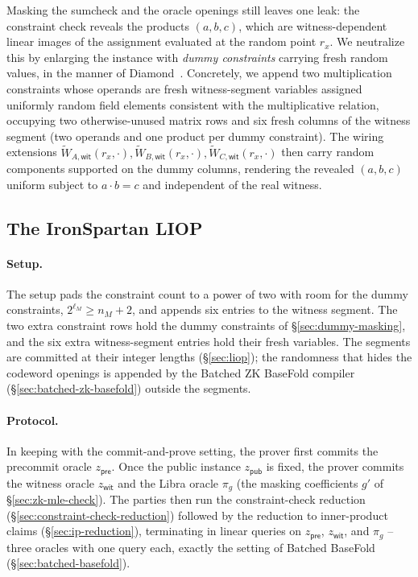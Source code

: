 \documentclass{article}
\theoremstyle{definition}
\newcommand*{\mle}{\widetilde}
\begin{document}
Masking the sumcheck and the oracle openings still leaves one leak: the constraint check reveals the products $(a, b, c)$, which are witness-dependent linear images of the assignment evaluated at the random point $r_x$. We neutralize this by enlarging the instance with \emph{dummy constraints} carrying fresh random values, in the manner of Diamond~\cite{Diamond:2025ac}. Concretely, we append two multiplication constraints whose operands are fresh witness-segment variables assigned uniformly random field elements consistent with the multiplicative relation, occupying two otherwise-unused matrix rows and six fresh columns of the witness segment (two operands and one product per dummy constraint). The wiring extensions $\mle{W}_{A, \textsf{wit}}(r_x, \cdot), \mle{W}_{B, \textsf{wit}}(r_x, \cdot), \mle{W}_{C, \textsf{wit}}(r_x, \cdot)$ then carry random components supported on the dummy columns, rendering the revealed $(a, b, c)$ uniform subject to $a \cdot b = c$ and independent of the real witness.

\subsection{The IronSpartan LIOP}
\label{sec:ironspartan-liop}

\paragraph{Setup.}
The setup pads the constraint count to a power of two with room for the dummy constraints, $2^{\ell_M} \ge n_M + 2$, and appends six entries to the witness segment. The two extra constraint rows hold the dummy constraints of \S\ref{sec:dummy-masking}, and the six extra witness-segment entries hold their fresh variables. The segments are committed at their integer lengths (\S\ref{sec:liop}); the randomness that hides the codeword openings is appended by the Batched ZK BaseFold compiler (\S\ref{sec:batched-zk-basefold}) outside the segments.

\paragraph{Protocol.}
In keeping with the commit-and-prove setting, the prover first commits the precommit oracle $z_{\textsf{pre}}$. Once the public instance $z_{\textsf{pub}}$ is fixed, the prover commits the witness oracle $z_{\textsf{wit}}$ and the Libra oracle $\pi_g$ (the masking coefficients $g'$ of \S\ref{sec:zk-mle-check}). The parties then run the constraint-check reduction (\S\ref{sec:constraint-check-reduction}) followed by the reduction to inner-product claims (\S\ref{sec:ip-reduction}), terminating in linear queries on $z_{\textsf{pre}}$, $z_{\textsf{wit}}$, and $\pi_g$ -- three oracles with one query each, exactly the setting of Batched BaseFold (\S\ref{sec:batched-basefold}).
\end{document}
